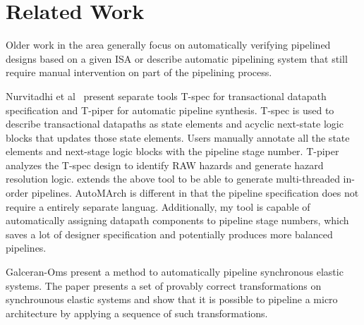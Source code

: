 \section{Related Work}
Older work in the area \cite{Kroening:2001-95}\cite{Matthews:1999-106}\cite{Marinescu:2001-105}\cite{Higgins:2005-76}\cite{Mishra:2004-111} generally focus on automatically verifying pipelined designs based on a given ISA or describe automatic pipelining system that still require manual intervention on part of the pipelining process.

Nurvitadhi et al~\cite{hoe:syn} present separate tools T-spec for transactional datapath specification and T-piper for automatic pipeline synthesis. T-spec is used to describe transactional datapaths as state elements and acyclic next-state logic blocks that updates those state elements. Users manually annotate all the state elements and next-stage logic blocks with the pipeline stage number. T-piper analyzes the T-spec design to identify RAW hazards and generate hazard resolution logic. \cite{hoe:mult} extends the above tool to be able to generate multi-threaded in-order pipelines. AutoMArch is different in that the pipeline specification does not require a entirely separate languag. Additionally, my tool is capable of automatically assigning datapath components to pipeline stage numbers, which saves a lot of designer specification and potentially produces more balanced pipelines.

Galceran-Oms \cite{AutoPipeElastic} present a method to automatically pipeline synchronous elastic systems. The paper presents a set of provably correct transformations on synchrounous elastic systems and show that it is possible to pipeline a micro architecture by applying a sequence of such transformations.
